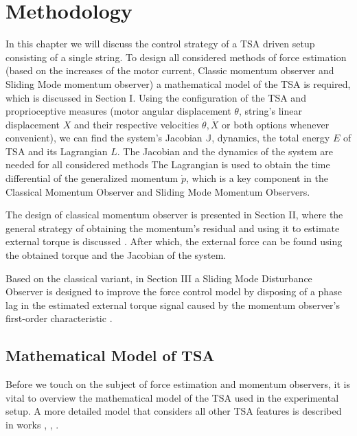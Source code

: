 \chapter{Methodology}
\label{chap:lr}

In this chapter we will discuss the control strategy of a TSA driven setup consisting of a single string. To design all considered methods of force estimation (based on the increases of the motor current, Classic momentum observer and Sliding Mode momentum observer) a mathematical model of the TSA is required, which is discussed in Section I. Using the configuration of the TSA and proprioceptive measures (motor angular displacement $\theta$, string's linear displacement $X$ and their respective velocities $\dot \theta, \dot X$ or both options whenever convenient), we can find the system's Jacobian $\mathbb{J}$, dynamics, the total energy $E$ of TSA and its Lagrangian $L$. The Jacobian and the dynamics of the system are needed for all considered methods  The Lagrangian is used to obtain the time differential of the generalized momentum $\dot p$, which is a key component in the Classical Momentum Observer and Sliding Mode Momentum Observers. 

The design of classical momentum observer is presented in Section II, where the general strategy of obtaining the momentum's residual and using it to estimate external torque is discussed \cite{coll_avoid}. After which, the external force can be found using the obtained torque and the Jacobian of the system.

Based on the classical variant, in Section III a Sliding Mode Disturbance Observer is designed to improve the force control model by disposing of a phase lag in the estimated external torque signal caused by the momentum observer's first-order characteristic \cite{sliding_mode}.


\section{Mathematical Model of TSA}

Before we touch on the subject of force estimation and momentum observers, it is vital to overview the mathematical model of the TSA used in the experimental setup. A more detailed model that considers all other TSA features is described in works \cite{TSA_intro}, \cite{TSA_oscillations}, \cite{TSA_math_model}.


